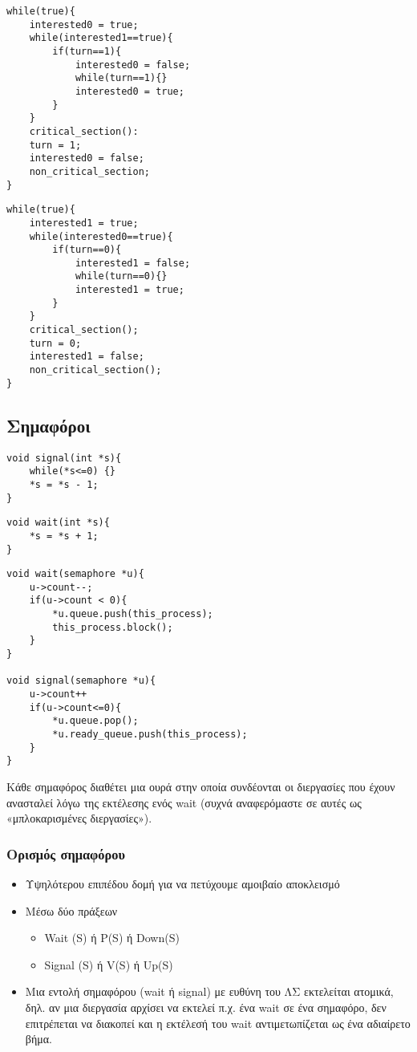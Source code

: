 \begin{lstlisting}[caption=Process P0]
while(true){
	interested0 = true;
	while(interested1==true){
		if(turn==1){
			interested0 = false;
			while(turn==1){}
			interested0 = true;
		}
	}
	critical_section():
	turn = 1;
	interested0 = false;
	non_critical_section;
}
\end{lstlisting}

\begin{lstlisting}[caption=Process P1]
while(true){
	interested1 = true;
	while(interested0==true){
		if(turn==0){
			interested1 = false;
			while(turn==0){}
			interested1 = true;
		}
	}
	critical_section();
	turn = 0;
	interested1 = false;
	non_critical_section();
}
\end{lstlisting}

\subsection{Σημαφόροι}

\begin{lstlisting}[caption=wait or P or down function implementaion]
void signal(int *s){
	while(*s<=0) {}
	*s = *s - 1;
}
\end{lstlisting}

\begin{lstlisting}[caption=signal or V or up function implementaiton]
void wait(int *s){
	*s = *s + 1;
}
\end{lstlisting}

\begin{lstlisting}[caption=General semaphore implementation]
void wait(semaphore *u){
	u->count--;
	if(u->count < 0){
		*u.queue.push(this_process);
		this_process.block();
	}
}

void signal(semaphore *u){
	u->count++
	if(u->count<=0){
		*u.queue.pop();
		*u.ready_queue.push(this_process);
	}
}
\end{lstlisting}

Κάθε σημαφόρος διαθέτει μια ουρά στην οποία συνδέονται οι διεργασίες που
έχουν ανασταλεί λόγω της εκτέλεσης ενός wait (συχνά αναφερόμαστε σε αυτές
ως «μπλοκαρισμένες διεργασίες»).

\subsubsection{Ορισμός σημαφόρου}

\begin{itemize}
	\item	Υψηλότερου επιπέδου δομή για να πετύχουμε αμοιβαίο αποκλεισμό
	\item	Μέσω δύο πράξεων
		\begin{itemize}
			\item	Wait (S) ή P(S) ή Down(S)
			\item	Signal (S) ή V(S) ή Up(S)
		\end{itemize}
	\item	Μια εντολή σημαφόρου (wait ή signal) με ευθύνη
		του ΛΣ εκτελείται ατομικά, δηλ. αν μια διεργασία
		αρχίσει να εκτελεί π.χ. ένα wait σε ένα σημαφόρο,
		δεν επιτρέπεται να διακοπεί και η εκτέλεσή του
		wait αντιμετωπίζεται ως ένα αδιαίρετο βήμα.
\end{itemize}

